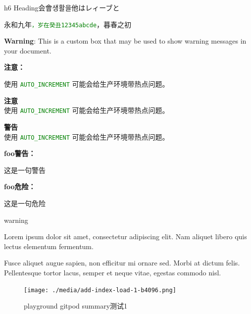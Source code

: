 \documentclass[
  paper=a4,
  ,captions=tableheading
]{scrartcl}
\renewenvironment{quote}{\begin{customblockquote}\list{}{\rightmargin=0em\leftmargin=0em}%
\item\relax\color{blockquote-text}\ignorespaces}{\unskip\unskip\endlist\end{customblockquote}}
\begin{document}
h6 Heading会會생활을他はレィーブと

永和九年\textcolor{green}{\lstinline{，岁在癸丑12345abcde}}，暮春之初

\textbf{Warning}: This is a custom box that may be used to show warning
messages in your document.

\begin{info-box}

\textbf{注意：}

使用 \textcolor{green}{\lstinline{AUTO_INCREMENT}}
可能会给生产环境带热点问题。

\end{info-box}

\begin{info-box}

\textbf{注意}\\
使用 \textcolor{green}{\lstinline{AUTO_INCREMENT}}
可能会给生产环境带热点问题。

\end{info-box}

\begin{warning-box}

\textbf{警告}\\
使用 \textcolor{green}{\lstinline{AUTO_INCREMENT}}
可能会给生产环境带热点问题。

\end{warning-box}

\begin{warning-box}

\textbf{foo警告：}

这是一句警告

\end{warning-box}

\begin{error-box}

\textbf{foo危险：}

这是一句危险

\end{error-box}

\begin{quote}
warning
\end{quote}

Lorem ipsum dolor sit amet, consectetur adipiscing elit. Nam aliquet
libero quis lectus elementum fermentum.

Fusce aliquet augue sapien, non efficitur mi ornare sed. Morbi at dictum
felis. Pellentesque tortor lacus, semper et neque vitae, egestas commodo
nisl.

\begin{figure}
\centering
\texttt{[image: ./media/add-index-load-1-b4096.png]}
\caption{playground gitpod summary测试1}
\end{figure}
\end{document}
